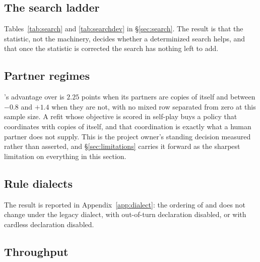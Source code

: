 \begin{table}[t]\centering
\caption{Paired mechanism ablations against \vsix{}: every variant plays the same deals against the
same panel, and the per-deal margin is bootstrapped resampling deals as clusters. A positive delta
means \vsix{} beats the variant.}
\label{tab:ablations}

\end{table}

\subsection{The search ladder}
\label{sec:results-search}

Tables~\ref{tab:search} and \ref{tab:searchdev} in \S\ref{sec:search}. The result is that the
statistic, not the machinery, decides whether a determinized search helps, and that once the
statistic is corrected the search has nothing left to add.

\subsection{Partner regimes}
\label{sec:results-calib}

\begin{table}[t]\centering
\caption{Win rate against three \vfive{} opponents with the two remaining seats of the acting team
played by the named policy, 800 games per cell at seed 313131. The self-play row is not the
headline, and the three rows below it are why.}
\label{tab:partners}

\end{table}

\vsix{}'s advantage over \vfive{} is $2.25$ points when its partners are copies of itself and
between $-0.8$ and $+1.4$ when they are not, with no mixed row separated from zero at this sample
size. A refit whose objective is scored in self-play buys a policy that coordinates with copies of
itself, and that coordination is exactly what a human partner does not supply. This is the project
owner's standing decision measured rather than asserted, and \S\ref{sec:limitations} carries it
forward as the sharpest limitation on everything in this section.

\subsection{Rule dialects}
\label{sec:results-dialects}

The result is reported in Appendix~\ref{app:dialect}: the ordering of \vsix{} and \vfive{} does not
change under the legacy dialect, with out-of-turn declaration disabled, or with cardless declaration
disabled.

\subsection{Throughput}
\label{sec:results-throughput}

\begin{table}[t]\centering
\caption{Games per second, self-play, all threads.}
\label{tab:throughput}

\end{table}
